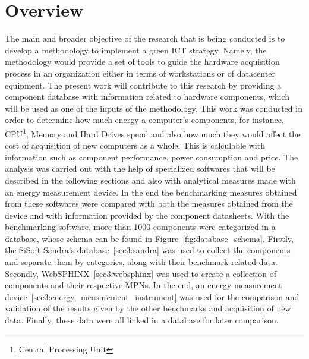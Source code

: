 \section{Overview} \label{sec3:overview}
    The main and broader objective of the research that is being conducted is to develop a methodology to implement a green ICT strategy. Namely, the methodology would provide a set of tools to guide the hardware acquisition process in an organization either in terms of workstations or of datacenter equipment. The present work will contribute to this research by providing a component database with information related to hardware components, which will be used as one of the inputs of the methodology. This work was conducted in order to determine how much energy a computer's components, for instance, CPU\footnote{Central Processing Unit}, Memory and Hard Drives spend and also how much they would affect the cost of acquisition of new computers as a whole. This is calculable with information such as component performance, power consumption and price. The analysis was carried out with the help of specialized softwares that will be described in the following sections and also with analytical measures made with an energy measurement device. In the end the benchmarking measures obtained from these softwares were compared with both the measures obtained from the device and with information provided by the component datasheets. With the benchmarking software, more than 1000 components were categorized in a database, whose schema can be found in Figure~\ref{fig:database_schema}. Firstly, the SiSoft Sandra's database~\ref{sec3:sandra} was used to collect the components and separate them by categories, along with their benchmark related data. Secondly, WebSPHINX~\ref{sec3:websphinx} was used to create a collection of components and their respective MPNs. In the end, an energy measurement device~\ref{sec3:energy_measurement_instrument} was used for the comparison and validation of the results given by the other benchmarks and acquisition of new data. 
    Finally, these data were all linked in a database for later comparison. 


